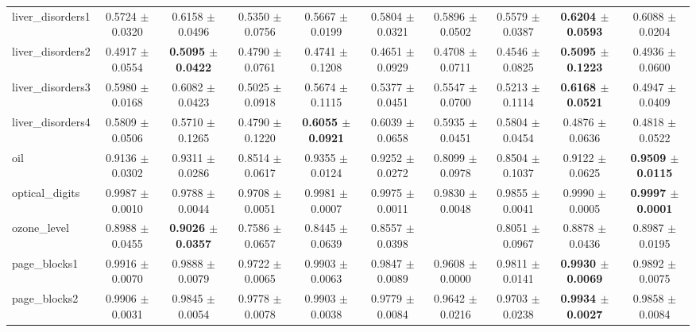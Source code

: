 \begin{table*}[htbp]
\begin{tabular}{lccccccccc}
            liver\_disorders1 & 0.5724 $\pm$ 0.0320 & 0.6158 $\pm$ 0.0496 & 0.5350 $\pm$ 0.0756 & 0.5667 $\pm$ 0.0199 & 0.5804 $\pm$ 0.0321 & 0.5896 $\pm$ 0.0502 & 0.5579 $\pm$ 0.0387 & \cellcolor{graybg}\textbf{0.6204 $\pm$ 0.0593} & 0.6088 $\pm$ 0.0204 \\ 
            liver\_disorders2 & 0.4917 $\pm$ 0.0554 & \cellcolor{graybg}\textbf{0.5095 $\pm$ 0.0422} & 0.4790 $\pm$ 0.0761 & 0.4741 $\pm$ 0.1208 & 0.4651 $\pm$ 0.0929 & 0.4708 $\pm$ 0.0711 & 0.4546 $\pm$ 0.0825 & \cellcolor{graybg}\textbf{0.5095 $\pm$ 0.1223} & 0.4936 $\pm$ 0.0600 \\ 
            liver\_disorders3 & 0.5980 $\pm$ 0.0168 & 0.6082 $\pm$ 0.0423 & 0.5025 $\pm$ 0.0918 & 0.5674 $\pm$ 0.1115 & 0.5377 $\pm$ 0.0451 & 0.5547 $\pm$ 0.0700 & 0.5213 $\pm$ 0.1114 & \cellcolor{graybg}\textbf{0.6168 $\pm$ 0.0521} & 0.4947 $\pm$ 0.0409 \\ 
            liver\_disorders4 & 0.5809 $\pm$ 0.0506 & 0.5710 $\pm$ 0.1265 & 0.4790 $\pm$ 0.1220 & \cellcolor{graybg}\textbf{0.6055 $\pm$ 0.0921} & 0.6039 $\pm$ 0.0658 & 0.5935 $\pm$ 0.0451 & 0.5804 $\pm$ 0.0454 & 0.4876 $\pm$ 0.0636 & 0.4818 $\pm$ 0.0522 \\ 
            oil & 0.9136 $\pm$ 0.0302 & 0.9311 $\pm$ 0.0286 & 0.8514 $\pm$ 0.0617 & 0.9355 $\pm$ 0.0124 & 0.9252 $\pm$ 0.0272 & 0.8099 $\pm$ 0.0978 & 0.8504 $\pm$ 0.1037 & 0.9122 $\pm$ 0.0625 & \cellcolor{graybg}\textbf{0.9509 $\pm$ 0.0115} \\ 
            optical\_digits & 0.9987 $\pm$ 0.0010 & 0.9788 $\pm$ 0.0044 & 0.9708 $\pm$ 0.0051 & 0.9981 $\pm$ 0.0007 & 0.9975 $\pm$ 0.0011 & 0.9830 $\pm$ 0.0048 & 0.9855 $\pm$ 0.0041 & 0.9990 $\pm$ 0.0005 & \cellcolor{graybg}\textbf{0.9997 $\pm$ 0.0001} \\ 
            ozone\_level & 0.8988 $\pm$ 0.0455 & \cellcolor{graybg}\textbf{0.9026 $\pm$ 0.0357} & 0.7586 $\pm$ 0.0657 & 0.8445 $\pm$ 0.0639 & 0.8557 $\pm$ 0.0398 &  & 0.8051 $\pm$ 0.0967 & 0.8878 $\pm$ 0.0436 & 0.8987 $\pm$ 0.0195 \\ 
            page\_blocks1 & 0.9916 $\pm$ 0.0070 & 0.9888 $\pm$ 0.0079 & 0.9722 $\pm$ 0.0065 & 0.9903 $\pm$ 0.0063 & 0.9847 $\pm$ 0.0089 & 0.9608 $\pm$ 0.0000 & 0.9811 $\pm$ 0.0141 & \cellcolor{graybg}\textbf{0.9930 $\pm$ 0.0069} & 0.9892 $\pm$ 0.0075 \\ 
            page\_blocks2 & 0.9906 $\pm$ 0.0031 & 0.9845 $\pm$ 0.0054 & 0.9778 $\pm$ 0.0078 & 0.9903 $\pm$ 0.0038 & 0.9779 $\pm$ 0.0084 & 0.9642 $\pm$ 0.0216 & 0.9703 $\pm$ 0.0238 & \cellcolor{graybg}\textbf{0.9934 $\pm$ 0.0027} & 0.9858 $\pm$ 0.0084 \\ 

\end{tabular}
\end{table*}
